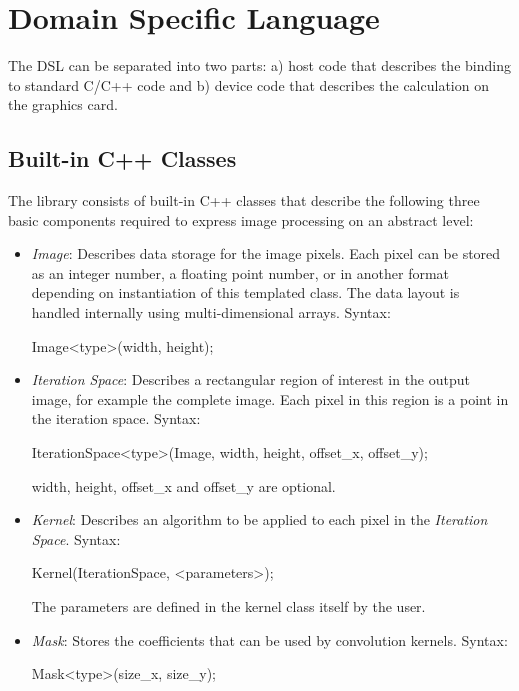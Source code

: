 \section{Domain Specific Language}
The \ac{DSL} can be separated into two parts: a) host code that describes the binding to standard C/C++ code and b) device code that describes the calculation on the graphics card.


%
%
\subsection{Built-in C++ Classes}\label{sec:framework:classes}
The library consists of built-in C++ classes that describe the following three basic components required to express image processing on an abstract level:
\begin{itemize}
    \item {\em Image}:
    Describes data storage for the image pixels. Each pixel can be stored as an
    integer number, a floating point number, or in another format depending on
    instantiation of this templated class. The data layout is handled internally
    using multi-dimensional arrays. Syntax:\\
\begin{code}
Image<type>(width, height);
\end{code}

    \item {\em Iteration Space}:
    Describes a rectangular region of interest in the output image, for example
    the complete image. Each pixel in this region is a point in the iteration
    space. Syntax:\\
\begin{code}
IterationSpace<type>(Image, width, height, offset_x, offset_y);
\end{code}
    width, height, offset\_x and offset\_y are optional.

    \item {\em Kernel}:
    Describes an algorithm to be applied to each pixel in the {\em Iteration
    Space}. Syntax:\\
\begin{code}
Kernel(IterationSpace, <parameters>);
\end{code}
    The parameters are defined in the kernel class itself by the user.

    \item {\em Mask}:
    Stores the coefficients that can be used by convolution kernels. Syntax:
\begin{code}
Mask<type>(size_x, size_y);
\end{code}


\end{itemize}
